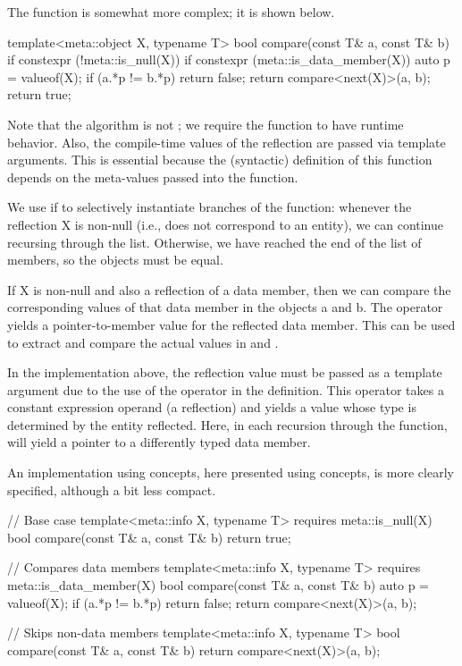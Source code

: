 The  function is somewhat more complex; it is shown below. 

\begin{codeblock}
template<meta::object X, typename T> 
bool compare(const T& a, const T& b) { 
  if constexpr (!meta::is_null(X)) { 
    if constexpr (meta::is_data_member(X)) { 
      auto p = valueof(X); 
      if (a.*p != b.*p) 
        return false; 
    }
    return compare<next(X)>(a, b); 
  } 
  return true; 
}
\end{codeblock}

Note that the algorithm is not ; we require the function to have runtime behavior. 
Also, the compile-time values of the reflection are passed via template arguments. 
This is essential because the (syntactic) definition of this function depends on the meta-values passed into the function. 

We use  if to selectively instantiate branches of the function: whenever the reflection X is non-null (i.e., does not correspond to an entity), we can continue recursing through the list. 
Otherwise, we have reached the end of the list of members, so the objects must be equal. 

If X is non-null and also a reflection of a data member, then we can compare the corresponding values of that data member in the objects a and b. 
The  operator yields a pointer-to-member value for the reflected data member. 
This can be used to extract and compare the actual values in  and . 

In the implementation above, the reflection value must be passed as a template argument due to the use of the  operator in the definition.
This operator takes a constant expression operand (a reflection) and yields a value whose type is determined by the entity reflected.
Here, in each recursion through the function,  will yield a pointer to a differently typed data member.  

An implementation using concepts, here presented using concepts, is more clearly specified, although a bit less compact. 

\begin{codeblock}
// Base case 
template<meta::info X, typename T> 
  requires meta::is_null(X)
bool compare(const T& a, const T& b) { 
  return true; 
} 
 
// Compares data members 
template<meta::info X, typename T> 
  requires meta::is_data_member(X)
bool compare(const T& a, const T& b) { 
  auto p = valueof(X); 
  if (a.*p != b.*p) 
    return false; 
  return compare<next(X)>(a, b); 
} 
 
// Skips non-data members 
template<meta::info X, typename T>
bool compare(const T& a, const T& b) { 
  return compare<next(X)>(a, b); 
} 
\end{codeblock}

